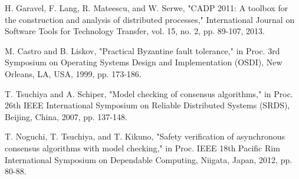 \documentclass[a4paper]{llncs}
\begin{document}
\begin{thebibliography}{00}
 H. Garavel, F. Lang, R. Mateescu, and W. Serwe, "CADP 2011: A toolbox for the construction and analysis of distributed processes," International Journal on Software Tools for Technology Transfer, vol. 15, no. 2, pp. 89-107, 2013.

 M. Castro and B. Liskov, "Practical Byzantine fault tolerance," in Proc. 3rd Symposium on Operating Systems Design and Implementation (OSDI), New Orleans, LA, USA, 1999, pp. 173-186.

 T. Tsuchiya and A. Schiper, "Model checking of consensus algorithms," in Proc. 26th IEEE International Symposium on Reliable Distributed Systems (SRDS), Beijing, China, 2007, pp. 137-148.

 T. Noguchi, T. Tsuchiya, and T. Kikuno, "Safety verification of asynchronous consensus algorithms with model checking," in Proc. IEEE 18th Pacific Rim International Symposium on Dependable Computing, Niigata, Japan, 2012, pp. 80-88.

\end{thebibliography}
    \vspace{12pt}
\end{document}

